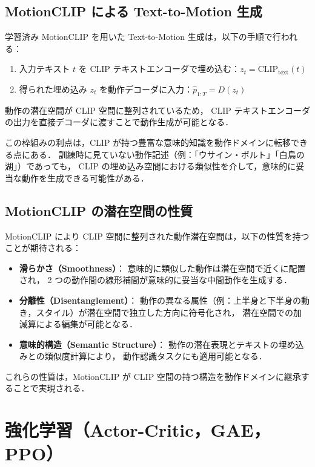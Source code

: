 \subsection{MotionCLIP による Text-to-Motion 生成}
\label{subsec:text_to_motion}

学習済み MotionCLIP を用いた Text-to-Motion 生成は，以下の手順で行われる：
\begin{enumerate}
  \item 入力テキスト $t$ を CLIP テキストエンコーダで埋め込む：$z_t = \mathrm{CLIP}_{\mathrm{text}}(t)$
  \item 得られた埋め込み $z_t$ を動作デコーダに入力：$\hat{p}_{1:T} = D(z_t)$
\end{enumerate}
動作の潜在空間が CLIP 空間に整列されているため，
CLIP テキストエンコーダの出力を直接デコーダに渡すことで動作生成が可能となる．

この枠組みの利点は，CLIP が持つ豊富な意味的知識を動作ドメインに転移できる点にある．
訓練時に見ていない動作記述（例：「ウサイン・ボルト」「白鳥の湖」）であっても，
CLIP の埋め込み空間における類似性を介して，意味的に妥当な動作を生成できる可能性がある．

\subsection{MotionCLIP の潜在空間の性質}
\label{subsec:latent_space_properties}

MotionCLIP により CLIP 空間に整列された動作潜在空間は，以下の性質を持つことが期待される：
\begin{itemize}
  \item \textbf{滑らかさ（Smoothness）}：
        意味的に類似した動作は潜在空間で近くに配置され，
        2 つの動作間の線形補間が意味的に妥当な中間動作を生成する．
  \item \textbf{分離性（Disentanglement）}：
        動作の異なる属性（例：上半身と下半身の動き，スタイル）が潜在空間で独立した方向に符号化され，
        潜在空間での加減算による編集が可能となる．
  \item \textbf{意味的構造（Semantic Structure）}：
        動作の潜在表現とテキストの埋め込みとの類似度計算により，
        動作認識タスクにも適用可能となる．
\end{itemize}

これらの性質は，MotionCLIP が CLIP 空間の持つ構造を動作ドメインに継承することで実現される．


\section{強化学習（Actor-Critic，GAE，PPO）}
\label{sec:RL}

